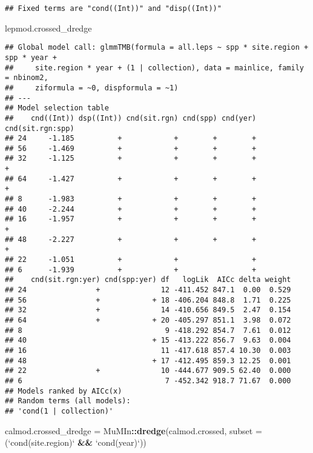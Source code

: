 \documentclass[]{article}
\newenvironment{Shaded}{\begin{snugshade}}{\end{snugshade}}
\newcommand{\KeywordTok}[1]{\textcolor[rgb]{0.13,0.29,0.53}{\textbf{#1}}}
\newcommand{\DataTypeTok}[1]{\textcolor[rgb]{0.13,0.29,0.53}{#1}}
\newcommand{\StringTok}[1]{\textcolor[rgb]{0.31,0.60,0.02}{#1}}
\newcommand{\OperatorTok}[1]{\textcolor[rgb]{0.81,0.36,0.00}{\textbf{#1}}}
\newcommand{\NormalTok}[1]{#1}
\begin{document}
\begin{verbatim}
## Fixed terms are "cond((Int))" and "disp((Int))"
\end{verbatim}

\begin{Shaded}
\begin{Highlighting}[]
\NormalTok{lepmod.crossed_dredge}
\end{Highlighting}
\end{Shaded}

\begin{verbatim}
## Global model call: glmmTMB(formula = all.leps ~ spp * site.region + spp * year + 
##     site.region * year + (1 | collection), data = mainlice, family = nbinom2, 
##     ziformula = ~0, dispformula = ~1)
## ---
## Model selection table 
##    cnd((Int)) dsp((Int)) cnd(sit.rgn) cnd(spp) cnd(yer) cnd(sit.rgn:spp)
## 24     -1.185          +            +        +        +                 
## 56     -1.469          +            +        +        +                 
## 32     -1.125          +            +        +        +                +
## 64     -1.427          +            +        +        +                +
## 8      -1.983          +            +        +        +                 
## 40     -2.244          +            +        +        +                 
## 16     -1.957          +            +        +        +                +
## 48     -2.227          +            +        +        +                +
## 22     -1.051          +            +                 +                 
## 6      -1.939          +            +                 +                 
##    cnd(sit.rgn:yer) cnd(spp:yer) df   logLik  AICc delta weight
## 24                +              12 -411.452 847.1  0.00  0.529
## 56                +            + 18 -406.204 848.8  1.71  0.225
## 32                +              14 -410.656 849.5  2.47  0.154
## 64                +            + 20 -405.297 851.1  3.98  0.072
## 8                                 9 -418.292 854.7  7.61  0.012
## 40                             + 15 -413.222 856.7  9.63  0.004
## 16                               11 -417.618 857.4 10.30  0.003
## 48                             + 17 -412.495 859.3 12.25  0.001
## 22                +              10 -444.677 909.5 62.40  0.000
## 6                                 7 -452.342 918.7 71.67  0.000
## Models ranked by AICc(x) 
## Random terms (all models): 
## 'cond(1 | collection)'
\end{verbatim}

\begin{Shaded}
\begin{Highlighting}[]
\NormalTok{calmod.crossed_dredge =}\StringTok{ }\NormalTok{MuMIn}\OperatorTok{::}\KeywordTok{dredge}\NormalTok{(calmod.crossed, }\DataTypeTok{subset =}\NormalTok{ (}\StringTok{`}\DataTypeTok{cond(site.region)}\StringTok{`} \OperatorTok{&&}\StringTok{ `}\DataTypeTok{cond(year)}\StringTok{`}\NormalTok{))}
\end{Highlighting}
\end{Shaded}
\end{document}
